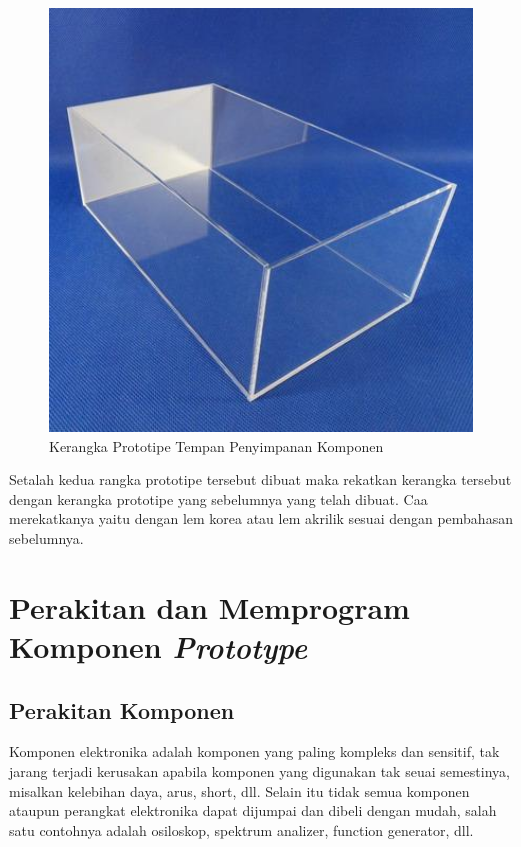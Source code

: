 \begin{enumerate}
\begin{figure}[H]
\centering
\includegraphics[width=1\textwidth]{figures/kubus2.jpg}
\caption{Kerangka Prototipe Tempan Penyimpanan Komponen }
\label{print}
\end{figure}

\par Setalah kedua rangka prototipe tersebut dibuat maka rekatkan kerangka tersebut dengan kerangka prototipe yang sebelumnya yang telah dibuat. Caa merekatkanya yaitu dengan lem korea atau lem akrilik sesuai dengan pembahasan sebelumnya.

\end{enumerate}

\section{Perakitan dan Memprogram Komponen \textit{Prototype}}
\subsection{Perakitan Komponen}

\par Komponen elektronika adalah komponen yang paling kompleks dan sensitif, tak jarang terjadi kerusakan apabila komponen yang digunakan tak seuai semestinya, misalkan kelebihan daya, arus, short, dll. Selain itu tidak semua komponen ataupun perangkat elektronika dapat dijumpai dan dibeli dengan mudah, salah satu contohnya adalah osiloskop, spektrum analizer, function generator, dll.

